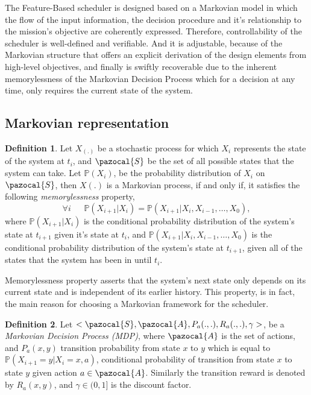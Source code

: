 \documentclass[12pt]{aastex62}
\theoremstyle{definition}
\newtheorem{defn}{Definition}
\begin{document}
The Feature-Based scheduler is designed based on a Markovian model in which the flow of the input information, the decision procedure and it's relationship to the mission's objective are coherently expressed. Therefore, controllability of the scheduler is well-defined and verifiable. And it is adjustable, because of the Markovian structure that offers an explicit derivation of the design elements from high-level objectives, and finally is swiftly recoverable due to the inherent memorylessness of the Markovian Decision Process which for a decision at any time, only requires the current state of the system.

\subsection{Markovian representation}\label{sec_Markov}
\begin{defn}
Let $X_{(.)}$ be a stochastic process for which $X_i$ represents the state of the system at $t_i$, and $\pazocal{S}$ be the set of all possible states that the system can take. Let $\mathbb{P}(X_i)$, be the probability distribution of $X_i$ on $\pazocal{S}$, then $X(.)$ is a Markovian process, if and only if, it satisfies the following \textit{memorylessness} property,
\begin{equation*}
\forall i ~~~~~~~\mathbb{P}(X_{{i+1}} | X_{i}) = \mathbb{P}(X_{{i+1}} | X_{i}, X_{{i-1}},\dots, X_{0}),
\end{equation*}
where $\mathbb{P}(X_{{i+1}} | X_{i})$ is the conditional probability distribution of the system's state at $t_{i+1}$ given it's state at $t_i$, and $\mathbb{P}(X_{{i+1}} | X_{i}, X_{{i-1}},\dots, X_{0})$ is the conditional probability distribution of the system's state at $t_{i+1}$, given all of the states that the system has been in until $t_i$.
\end{defn}
Memorylessness property asserts that the system's next state only depends on its current state and is independent of its earlier history. This property, is in fact, the main reason for choosing a Markovian framework for the scheduler. 
\begin{defn}
Let $<\pazocal{S},\pazocal{A}, P_a(.,.), R_a(.,.), \gamma>$, be a \textit{Markovian Decision Process (MDP)}, where $\pazocal{A}$ is the set of actions, and $P_a(x, y)$ transition probability from state $x$ to $y$ which is equal to $\mathbb{P}(X_{i+1}=y | X_i=x, a)$, conditional probability of transition from state $x$ to state $y$ given action $a \in  \pazocal{A}$. Similarly the transition reward is denoted by $R_a(x,y)$, and $\gamma \in (0,1]$ is the discount factor.
\end{defn}
\end{document}
